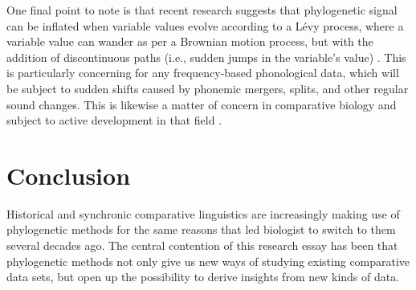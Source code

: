 One final point to note is that recent research suggests that phylogenetic signal can be inflated when variable values evolve according to a Lévy process, where a variable value can wander as per a Brownian motion process, but with the addition of discontinuous paths (i.e., sudden jumps in the variable's value) \autocite{uyeda_rethinking_2018}. This is particularly concerning for any frequency-based phonological data, which will be subject to sudden shifts caused by phonemic mergers, splits, and other regular sound changes. This is likewise a matter of concern in comparative biology and subject to active development in that field \autocite{uyeda_rethinking_2018}.

\hypertarget{pcms-conclusion}{%
\section{Conclusion}\label{pcms-conclusion}}

Historical and synchronic comparative linguistics are increasingly making use of phylogenetic methods for the same reasons that led biologist to switch to them several decades ago. The central contention of this research essay has been that phylogenetic methods not only give us new ways of studying existing comparative data sets, but open up the possibility to derive insights from new kinds of data.

